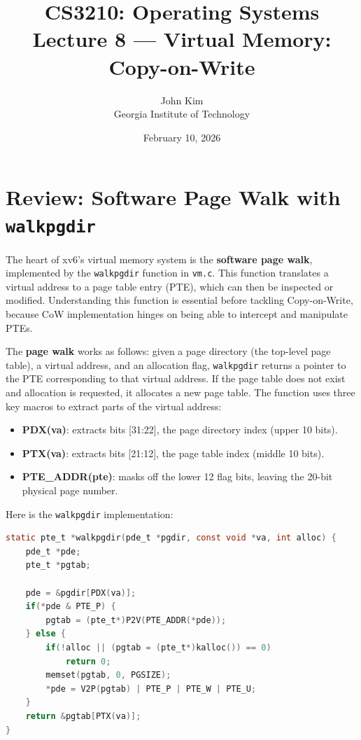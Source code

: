 \documentclass[11pt]{article}
\title{\textbf{CS3210: Operating Systems} \\ Lecture 8 --- Virtual Memory: Copy-on-Write}
\author{John Kim \\ Georgia Institute of Technology}
\date{February 10, 2026}
\begin{document}
\maketitle
\tableofcontents
\newpage

\section{Review: Software Page Walk with \texttt{walkpgdir}}

The heart of xv6's virtual memory system is the \textbf{software page walk}, implemented by the \texttt{walkpgdir} function in \texttt{vm.c}. This function translates a virtual address to a page table entry (PTE), which can then be inspected or modified. Understanding this function is essential before tackling Copy-on-Write, because CoW implementation hinges on being able to intercept and manipulate PTEs.

The \textbf{page walk} works as follows: given a page directory (the top-level page table), a virtual address, and an allocation flag, \texttt{walkpgdir} returns a pointer to the PTE corresponding to that virtual address. If the page table does not exist and allocation is requested, it allocates a new page table. The function uses three key macros to extract parts of the virtual address:

\begin{itemize}
    \item \textbf{PDX(va)}: extracts bits [31:22], the page directory index (upper 10 bits).
    \item \textbf{PTX(va)}: extracts bits [21:12], the page table index (middle 10 bits).
    \item \textbf{PTE\_ADDR(pte)}: masks off the lower 12 flag bits, leaving the 20-bit physical page number.
\end{itemize}

Here is the \texttt{walkpgdir} implementation:

\begin{lstlisting}[language=C, caption={The \texttt{walkpgdir} function from xv6 vm.c}]
static pte_t *walkpgdir(pde_t *pgdir, const void *va, int alloc) {
    pde_t *pde;
    pte_t *pgtab;

    pde = &pgdir[PDX(va)];
    if(*pde & PTE_P) {
        pgtab = (pte_t*)P2V(PTE_ADDR(*pde));
    } else {
        if(!alloc || (pgtab = (pte_t*)kalloc()) == 0)
            return 0;
        memset(pgtab, 0, PGSIZE);
        *pde = V2P(pgtab) | PTE_P | PTE_W | PTE_U;
    }
    return &pgtab[PTX(va)];
}
\end{lstlisting}
\end{document}
